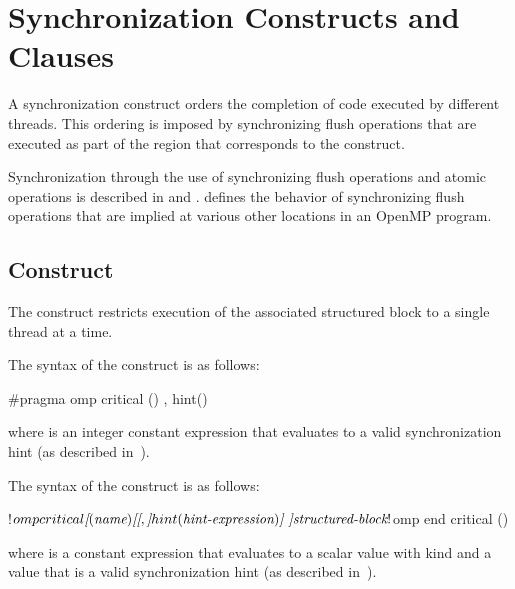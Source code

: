 \section{Synchronization Constructs and Clauses}
\label{sec:Synchronization Constructs and Clauses}
A synchronization construct orders the completion of code executed by
different threads. This ordering is imposed by synchronizing flush operations
that are executed as part of the region that corresponds to the construct.

Synchronization through the use of synchronizing flush operations and atomic
operations is described in  and 
. 
defines the behavior of synchronizing flush operations that are
implied at various other locations in an OpenMP program.

\subsection{ Construct}
\label{subsec:critical Construct}
\summary
The  construct restricts execution of the associated structured block to a
single thread at a time.

\syntax
\begin{ccppspecific}
The syntax of the  construct is as follows:

\begin{ompcPragma}
  #pragma omp critical \plc{[}() \plc{[[},\plc{]} hint()\plc{] ] new-line}
\end{ompcPragma}

where  is an integer constant expression that
evaluates to a valid synchronization hint (as described in~).
\end{ccppspecific}

\begin{fortranspecific}
The syntax of the  construct is as follows:

\begin{ompfPragma}
!$omp critical \plc{[}(\plc{name}) \plc{[[},\plc{]} hint(\plc{hint-expression})\plc{] ]}
    \plc{structured-block}
!$omp end critical \plc{[}()\plc{]}
\end{ompfPragma}

where  is a constant expression that evaluates to
a scalar value with kind  and  a value
that is a valid synchronization hint (as described
in~).
\end{fortranspecific}

